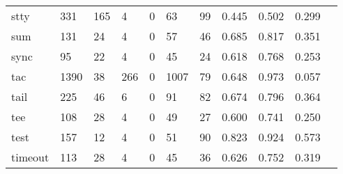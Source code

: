 \begin{longtable}{lp{1.10cm}p{1.10cm}p{1.10cm}p{1.10cm}p{1.10cm}p{1.10cm}p{1.10cm}p{1.10cm}p{1.10cm}p{1.10cm}}
stty      &                    331 &                                165 &                                 4 &                                0 &                                63 &                              99 &                          0.445 &                                 0.502 &                               0.299 \\
sum       &                    131 &                                 24 &                                 4 &                                0 &                                57 &                              46 &                          0.685 &                                 0.817 &                               0.351 \\
sync      &                     95 &                                 22 &                                 4 &                                0 &                                45 &                              24 &                          0.618 &                                 0.768 &                               0.253 \\
tac       &                   1390 &                                 38 &                               266 &                                0 &                              1007 &                              79 &                          0.648 &                                 0.973 &                               0.057 \\
tail      &                    225 &                                 46 &                                 6 &                                0 &                                91 &                              82 &                          0.674 &                                 0.796 &                               0.364 \\
tee       &                    108 &                                 28 &                                 4 &                                0 &                                49 &                              27 &                          0.600 &                                 0.741 &                               0.250 \\
test      &                    157 &                                 12 &                                 4 &                                0 &                                51 &                              90 &                          0.823 &                                 0.924 &                               0.573 \\
timeout   &                    113 &                                 28 &                                 4 &                                0 &                                45 &                              36 &                          0.626 &                                 0.752 &                               0.319 \\

\end{longtable}
